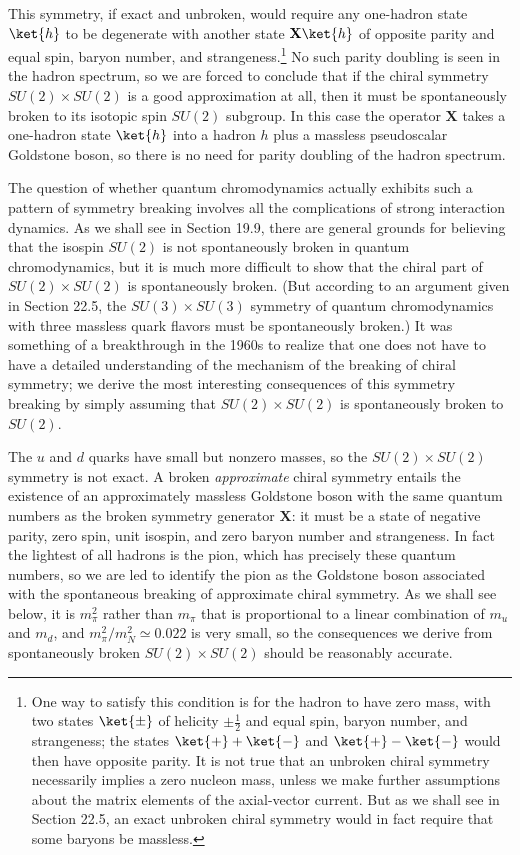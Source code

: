 This symmetry, if exact and unbroken, would require any one-hadron state $\ket{h}$ to be degenerate with another state $\mathbf{X}\ket{h}$ of opposite parity and equal spin, baryon number, and strangeness.\footnote{One way to satisfy this condition is for the hadron to have zero mass, with two states $\ket{\pm}$ of helicity $\pm\frac12$ and equal spin, baryon number, and strangeness; the states $\ket{+}+\ket{-}$ and $\ket{+}-\ket{-}$ would then have opposite parity. It is not true that an unbroken chiral symmetry necessarily implies a zero nucleon mass, unless we make further assumptions about the matrix elements of the axial-vector current. But as we shall see in Section 22.5, an exact unbroken chiral symmetry would in fact require that some baryons be massless.} No such parity doubling is seen in the hadron spectrum, so we are forced to conclude that if the chiral symmetry $SU(2)\times SU(2)$ is a good approximation at all, then it must be spontaneously broken to its isotopic spin $SU(2)$ subgroup. In this case the operator $\mathbf{X}$ takes a one-hadron state $\ket{h}$ into a hadron $h$ plus a massless pseudoscalar Goldstone boson, so there is no need for parity doubling of the hadron spectrum.

The question of whether quantum chromodynamics actually exhibits such a pattern of symmetry breaking involves all the complications of strong interaction dynamics. As we shall see in Section 19.9, there are general grounds for believing that the isospin $SU(2)$ is not spontaneously broken in quantum chromodynamics, but it is much more difficult to show that the chiral part of $SU(2)\times SU(2)$ is spontaneously broken. (But according to an argument given in Section 22.5, the $SU(3)\times SU(3)$ symmetry of quantum chromodynamics with three massless quark flavors must be spontaneously broken.) It was something of a breakthrough in the 1960s to realize that one does not have to have a detailed understanding of the mechanism of the breaking of chiral symmetry; we derive the most interesting consequences of this symmetry breaking by simply assuming that $SU(2)\times SU(2)$ is spontaneously broken to $SU(2)$.

The $u$ and $d$ quarks have small but nonzero masses, so the $SU(2)\times SU(2)$ symmetry is not exact. A broken \emph{approximate} chiral symmetry entails the existence of an approximately massless Goldstone boson with the same quantum numbers as the broken symmetry generator $\mathbf{X}$: it must be a state of negative parity, zero spin, unit isospin, and zero baryon number and strangeness. In fact the lightest of all hadrons is the pion, which has precisely these quantum numbers, so we are led to identify the pion as the Goldstone boson associated with the spontaneous breaking of approximate chiral symmetry. As we shall see below, it is $m_\pi^2$ rather than $m_\pi$ that is proportional to a linear combination of $m_u$ and $m_d$, and $m_\pi^2/m_N^2\simeq0.022$ is very small, so the consequences we derive from spontaneously broken $SU(2)\times SU(2)$ should be reasonably accurate.

